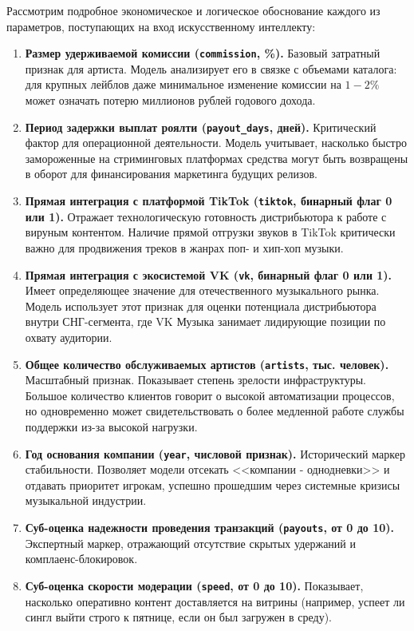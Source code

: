 \documentclass[14pt, a4paper]{extarticle}
\begin{document}
Рассмотрим подробное экономическое и логическое обоснование каждого из параметров, поступающих на вход искусственному интеллекту:
\begin{enumerate}
    \item \textbf{Размер удерживаемой комиссии (\texttt{commission}, \%).} Базовый затратный признак для артиста. Модель анализирует его в связке с объемами каталога: для крупных лейблов даже минимальное изменение комиссии на $1-2\%$ может означать потерю миллионов рублей годового дохода.
    \item \textbf{Период задержки выплат роялти (\texttt{payout\_days}, дней).} Критический фактор для операционной деятельности. Модель учитывает, насколько быстро замороженные на стриминговых платформах средства могут быть возвращены в оборот для финансирования маркетинга будущих релизов.
    \item \textbf{Прямая интеграция с платформой TikTok (\texttt{tiktok}, бинарный флаг 0 или 1).} Отражает технологическую готовность дистрибьютора к работе с вируным контентом. Наличие прямой отгрузки звуков в TikTok критически важно для продвижения треков в жанрах поп- и хип-хоп музыки.
    \item \textbf{Прямая интеграция с экосистемой VK (\texttt{vk}, бинарный флаг 0 или 1).} Имеет определяющее значение для отечественного музыкального рынка. Модель использует этот признак для оценки потенциала дистрибьютора внутри СНГ-сегмента, где VK Музыка занимает лидирующие позиции по охвату аудитории.
    \item \textbf{Общее количество обслуживаемых артистов (\texttt{artists}, тыс. человек).} Масштабный признак. Показывает степень зрелости инфраструктуры. Большое количество клиентов говорит о высокой автоматизации процессов, но одновременно может свидетельствовать о более медленной работе службы поддержки из-за высокой нагрузки.
    \item \textbf{Год основания компании (\texttt{year}, числовой признак).} Исторический маркер стабильности. Позволяет модели отсекать <<компании - однодневки>> и отдавать приоритет игрокам, успешно прошедшим через системные кризисы музыкальной индустрии.
    \item \textbf{Суб-оценка надежности проведения транзакций (\texttt{payouts}, от 0 до 10).} Экспертный маркер, отражающий отсутствие скрытых удержаний и комплаенс-блокировок.
    \item \textbf{Суб-оценка скорости модерации (\texttt{speed}, от 0 до 10).} Показывает, насколько оперативно контент доставляется на витрины (например, успеет ли сингл выйти строго к пятнице, если он был загружен в среду).

\end{enumerate}
\end{document}
